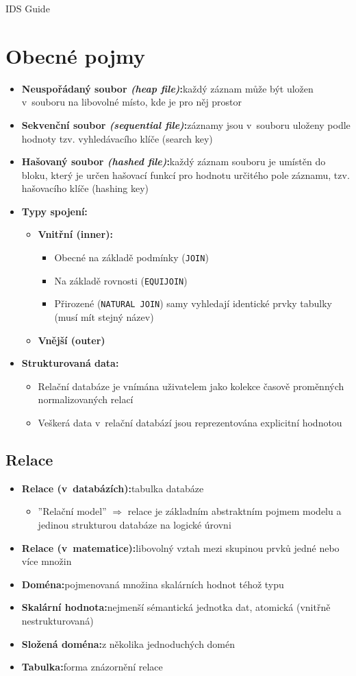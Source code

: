 \documentclass[a4paper,10pt]{article}
\newcommand{\pojem}[2]{\item \textbf{#1:}\quad #2}
\newcommand{\tedy}{$\Rightarrow$ }
\begin{document}
	{\Huge IDS Guide} \\[1cm]
	
	\vfill
	\tableofcontents

	\newpage
	\section{Obecné pojmy}
		\begin{itemize}

			\pojem{Neuspořádaný soubor \emph{(heap file)}}{každý záznam může být uložen v~souboru na libovolné místo, kde je pro něj prostor}
			\pojem{Sekvenční soubor \emph{(sequential file)}}{záznamy jsou v~souboru uloženy podle hodnoty tzv. vyhledávacího klíče (search key)}
			\pojem{Hašovaný soubor \emph{(hashed file)}}{každý záznam souboru je umístěn do bloku, který je určen hašovací funkcí pro hodnotu určitého pole záznamu, tzv. hašovacího klíče (hashing key)}
			
			\pojem{Typy spojení}
			\begin{itemize}
				\pojem{Vnitřní (inner)}
				\begin{itemize}
					\item Obecné na základě podmínky (\texttt{JOIN})
					\item Na základě rovnosti (\texttt{EQUIJOIN})
					\item Přirozené (\texttt{NATURAL JOIN}) samy vyhledají identické prvky tabulky (musí mít stejný název)
				\end{itemize}
				\item \textbf{Vnější (outer)}
			\end{itemize}

			\pojem{Strukturovaná data}
			\begin{itemize}
				\item Relační databáze je vnímána uživatelem jako kolekce časově proměnných normalizovaných relací
				\item Veškerá data v~relační databází jsou reprezentována explicitní hodnotou 
			\end{itemize}
		\end{itemize}

		\subsection{Relace}
			\begin{itemize}
				\pojem{Relace (v~databázích)}{tabulka databáze}
				\begin{itemize}
					\item ''Relační model'' \tedy relace je základním abstraktním pojmem modelu a jedinou strukturou databáze na logické úrovni
				\end{itemize}
				\pojem{Relace (v~matematice)}{libovolný vztah mezi skupinou prvků jedné nebo více množin}

				\pojem{Doména}{pojmenovaná množina skalárních hodnot téhož typu}
				\pojem{Skalární hodnota}{nejmenší sémantická jednotka dat, atomická (vnitřně nestrukturovaná)}
				\pojem{Složená doména}{z několika jednoduchých domén}
				\pojem{Tabulka}{forma znázornění relace}
			\end{itemize}
\end{document}
